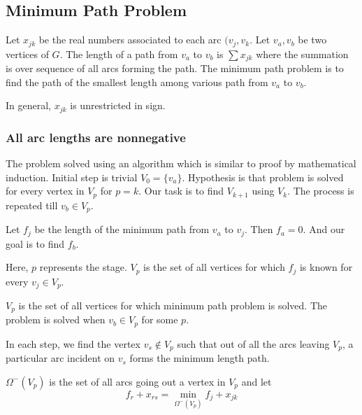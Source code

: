 \subsection{Minimum Path Problem}
\begin{definition}
	Let $x_{jk}$ be the real numbers associated to each arc $(v_j,v_k$. Let $v_a, v_b$ be two vertices of $G$. The length of a path from $v_a$ to $v_b$ is $\sum x_{jk}$ where the summation is over sequence of all arcs forming the path. The minimum path problem is to find the path of the smallest length among various path from $v_a$ to $v_b$.
\end{definition}

\begin{remark}
In general, $x_{jk}$ is unrestricted in sign.
\end{remark}

\subsubsection{All arc lengths are nonnegative}
\begin{commentary}
	The problem solved using an algorithm which is similar to proof by mathematical induction. 
	Initial step is trivial $V_0 = \{ v_a \}$. Hypothesis is that problem is solved for every vertex in $V_p$ for $p = k$. Our task is to find $V_{k+1}$ using $V_k$. The process is repeated till $v_b \in V_p$.
\end{commentary}

	Let $f_j$ be the length of the minimum path from $v_a$ to $v_j$. Then $f_a = 0$. And our goal is to find $f_b$.

\begin{commentary}
	Here, $p$ represents the stage. $V_p$ is the set of all vertices for which $f_j$ is known for every $v_j \in V_p$.
\end{commentary}

	$V_p$ is the set of all vertices for which minimum path problem is solved. The problem is solved when $v_b \in V_p$ for some $p$.

\begin{commentary}
	In each step, we find the vertex $v_s \notin V_p$ such that out of all the arcs leaving $V_p$, a particular arc incident on $v_s$ forms the minimum length path.
\end{commentary}

	$\Omega^-(V_p)$ is the set of all arcs going out a vertex in $V_p$ and let 
$$ f_r + x_{rs} = \min_{\Omega^-(V_p)} f_j + x_{jk} $$

